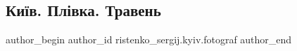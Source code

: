  
 
 
 
 

\subsection{Київ. Плівка. Травень}
\label{sec:24_05_2023.fb.ristenko_sergij.kyiv.fotograf.1.kyiv_plivka_traven}

\ifcmt
 author_begin
   author_id ristenko_sergij.kyiv.fotograf
 author_end
\fi
